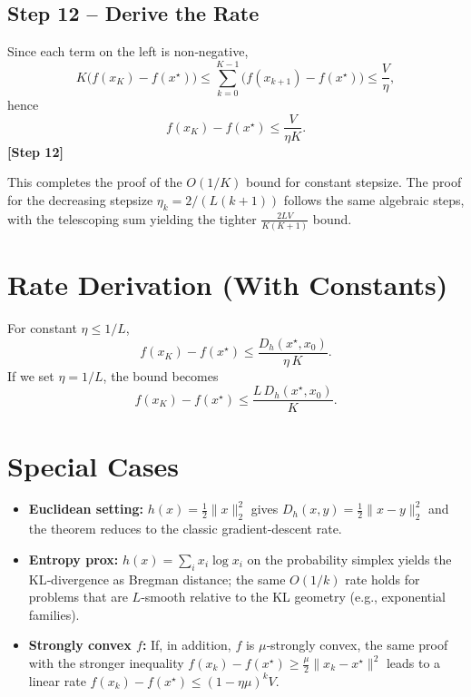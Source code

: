 \documentclass{article}
\newcommand{\Breg}[2]{D_h(#1,#2)}
\begin{document}
\subsection*{Step 12 – Derive the Rate}
Since each term on the left is non‑negative,
\[
K\big(f(x_{K})-f(x^{\star})\big)\le \sum_{k=0}^{K-1}\big(f(x_{k+1})-f(x^{\star})\big)
\le \frac{V}{\eta},
\]
hence
\[
f(x_{K})-f(x^{\star})\le \frac{V}{\eta K}.
\]
\textbf{[Step 12]}

This completes the proof of the $O(1/K)$ bound for constant stepsize. The proof for the decreasing stepsize $\eta_k=2/(L(k+1))$ follows the same algebraic steps, with the telescoping sum yielding the tighter $\frac{2LV}{K(K+1)}$ bound.

\section*{Rate Derivation (With Constants)}
For constant $\eta\le 1/L$,
\[
\boxed{f(x_{K})-f(x^{\star})\le \frac{\Breg{x^{\star}}{x_0}}{\eta\,K}}.
\]
If we set $\eta=1/L$, the bound becomes
\[
f(x_{K})-f(x^{\star})\le \frac{L\,\Breg{x^{\star}}{x_0}}{K}.
\]

\section*{Special Cases}
\begin{itemize}
\item \textbf{Euclidean setting:} $h(x)=\tfrac12\|x\|_2^{2}$ gives $\Breg{x}{y}= \tfrac12\|x-y\|_2^{2}$ and the theorem reduces to the classic gradient‑descent rate.
\item \textbf{Entropy prox:} $h(x)=\sum_{i}x_i\log x_i$ on the probability simplex yields the KL‑divergence as Bregman distance; the same $O(1/k)$ rate holds for problems that are $L$‑smooth relative to the KL geometry (e.g., exponential families).
\item \textbf{Strongly convex $f$:} If, in addition, $f$ is $\mu$‑strongly convex, the same proof with the stronger inequality $f(x_k)-f(x^{\star})\ge \frac{\mu}{2}\|x_k-x^{\star}\|^{2}$ leads to a linear rate $f(x_k)-f(x^{\star})\le (1-\eta\mu)^{k}V$.
\end{itemize}
\end{document}
